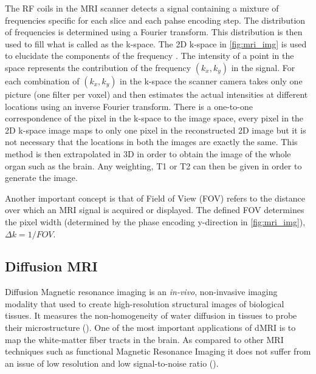 \documentclass[msthesis.tex]{subfiles}
\begin{document}
The RF coils in the MRI scanner detects a signal containing a mixture of frequencies specific for each slice and each pahse encoding step. The distribution of frequencies is determined using a Fourier transform. This distribution is then used to fill what is called as the k-space. The 2D k-space in  \autoref{fig:mri_img} is used to elucidate the components of the frequency . The intensity of a point in the space represents the contribution of the frequency $(k_x,k_y)$ in the signal. For each combination of $(k_x, k_y)$ in the k-space the scanner camera takes only one picture (one filter per voxel) and then estimates the actual intensities at different locations using an inverse Fourier transform. There is a one-to-one correspondence of the pixel in the k-space to the image space, every pixel in the 2D k-space image maps to only one pixel in the reconstructed 2D image but it is not necessary that the locations in both the images are exactly the same. This method is then extrapolated in 3D in order to obtain the image of the whole organ such as the brain. Any weighting, T1 or T2 can then be given in order to generate the image.

Another important concept is that of Field of View (FOV) refers to the distance over which an MRI signal is acquired or displayed. The defined FOV determines the pixel width (determined by the phase encoding y-direction in  \autoref{fig:mri_img}), $\Delta k = 1/FOV$. 



\subsection{Diffusion MRI}

Diffusion Magnetic resonance imaging is an \textit{in-vivo}, non-invasive imaging modality that used to create high-resolution structural images of biological tissues. It measures the non-homogeneity of water diffusion in tissues to probe their microstructure (\cite{ghosh2015survey}). One of the most important applications of dMRI is to map the white-matter fiber tracts in the brain. As compared to other MRI techniques such as functional Magnetic Resonance Imaging it does not suffer from an issue of low resolution and low signal-to-noise ratio (\cite{wong2016}). 
\end{document}

